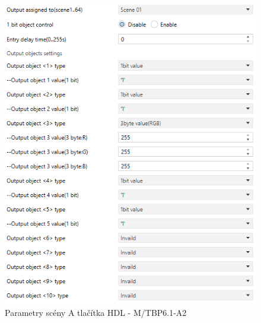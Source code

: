 \begin{figure}[!ht]
  \begin{center}
    \includegraphics[scale=0.4]{obrazky/Scena A.png}
  \end{center}
  \caption[Parametry scény A tlačítka HDL - M/TBP6.1-A2]{Parametry scény A tlačítka HDL - M/TBP6.1-A2}
  \label{fig:Parametry scény A tlačítka HDL - M/TBP6.1-A2}
\end{figure}

